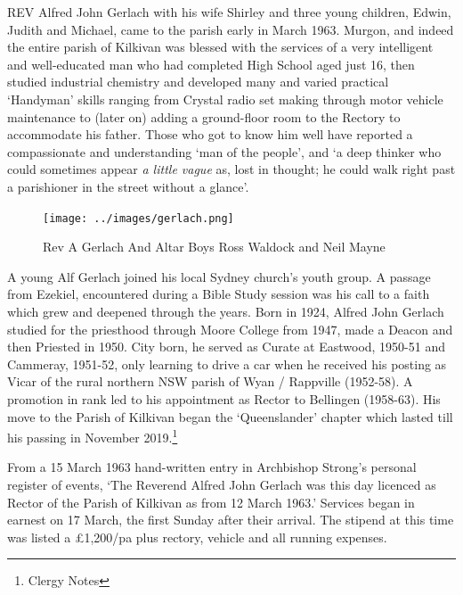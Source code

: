 \lettrine[lines=3]{R}{EV}
 Alfred John Gerlach with his wife Shirley and three young children, Edwin, Judith and Michael, came to the parish early in March 1963. Murgon, and indeed the entire parish of Kilkivan was blessed with the services of a very intelligent and well-educated man who had completed High School aged just 16, then studied industrial chemistry and developed many and varied practical `Handyman' skills ranging from Crystal radio set making through motor vehicle maintenance to (later on) adding a ground-floor room to the Rectory to accommodate his father. Those who got to know him well have reported a compassionate and understanding `man of the people', and `a deep thinker who could sometimes appear \emph{a little vague} as, lost in thought; he could walk right past a parishioner in the street without a glance'.







\begin{figure}[!htb]
\begin{center}
\texttt{[image: ../images/gerlach.png]}
\caption{Rev A Gerlach And Altar Boys Ross Waldock and Neil Mayne}
\end{center}
\end{figure}




A young Alf Gerlach joined his local Sydney church's youth group. A passage from Ezekiel, encountered during a Bible Study session was his call to a faith which grew and deepened through the years. Born in 1924, Alfred John Gerlach studied for the priesthood through Moore College from 1947, made a Deacon and then Priested in 1950. City born, he served as Curate at Eastwood, 1950-51 and Cammeray, 1951-52, only learning to drive a car when he received his posting as Vicar of the rural northern NSW parish of Wyan / Rappville (1952-58). A promotion in rank led to his appointment as Rector to Bellingen (1958-63). His move to the Parish of Kilkivan began the `Queenslander' chapter which lasted till his passing in November 2019.\footnote{Clergy Notes}


From a 15 March 1963 hand-written entry in Archbishop Strong's personal register of events, `The Reverend Alfred John Gerlach was this day licenced as Rector of the Parish of Kilkivan as from 12 March 1963.' Services began in earnest on 17 March, the first Sunday after their arrival. The stipend at this time was listed a \pounds1,200/pa plus rectory, vehicle and all running expenses.










